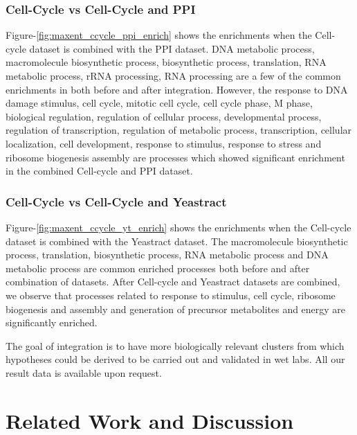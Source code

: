 \subsubsection{Cell-Cycle vs Cell-Cycle and PPI}
Figure-\ref{fig:maxent_ccycle_ppi_enrich} shows the enrichments when the Cell-cycle dataset is combined with the PPI dataset. 
DNA metabolic process, macromolecule biosynthetic process, biosynthetic process, translation, RNA metabolic process, rRNA processing, 
RNA processing are a few of the common enrichments in both before and after integration. However, the response to DNA damage stimulus, cell cycle, mitotic cell cycle, 
cell cycle phase, M phase, biological regulation, regulation of cellular process, developmental process, regulation of transcription, 
regulation of metabolic process, transcription, cellular localization, cell development, response to stimulus, response to 
stress and ribosome biogenesis assembly are processes which showed significant enrichment in the combined Cell-cycle and PPI dataset.

\subsubsection{Cell-Cycle vs Cell-Cycle and Yeastract}
Figure-\ref{fig:maxent_ccycle_yt_enrich} shows the enrichments when the Cell-cycle dataset is combined with the Yeastract dataset. 
The macromolecule biosynthetic process, translation, biosynthetic process, RNA metabolic process and DNA metabolic process are common enriched processes 
both before and after combination of datasets. After Cell-cycle and Yeastract datasets are combined, we observe that processes related to response to stimulus, 
cell cycle, ribosome biogenesis and assembly and generation of precursor metabolites and energy are significantly enriched.

The goal of integration is to have more biologically relevant clusters from which hypotheses could be derived to be carried out and validated in wet labs. 
All our result data is available upon request. 

\section{Related Work and Discussion}

